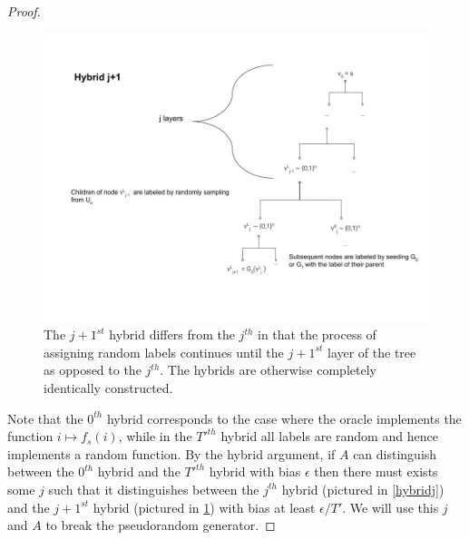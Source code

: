 \begin{proof}
\begin{figure}
\centering
\includegraphics[width=\textwidth, height=0.25\paperheight, keepaspectratio]{../figure/hybrid_j1_thm_5-1.jpg}
\caption{The \(j+1^{st}\) hybrid differs from the \(j^{th}\) in that the
process of assigning random labels continues until the \(j+1^{st}\)
layer of the tree as opposed to the \(j^{th}\). The hybrids are
otherwise completely identically constructed.}
\label{hybridj1}
\end{figure}

Note that the \(0^{th}\) hybrid corresponds to the case where the oracle
implements the function \(i\mapsto f_s(i)\), while in the \(T'^{th}\)
hybrid all labels are random and hence implements a random function. By
the hybrid argument, if \(A\) can distinguish between the \(0^{th}\)
hybrid and the \(T'^{th}\) hybrid with bias \(\epsilon\) then there must
exists some \(j\) such that it distinguishes between the \(j^{th}\)
hybrid (pictured in \cref{hybridj}) and the \(j+1^{st}\) hybrid
(pictured in \cref{hybridj1}) with bias at least \(\epsilon/T'\). We
will use this \(j\) and \(A\) to break the pseudorandom generator.


\end{proof}
